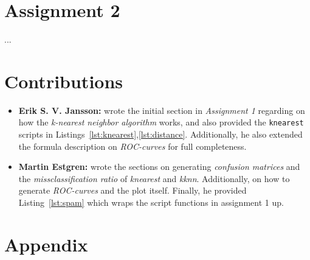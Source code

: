 \documentclass[a4paper, twocolumn]{article}
\begin{document}
    \section*{Assignment 2}

    ...

    \section*{Contributions}

    \begin{itemize}
        \item{\textbf{Erik S. V. Jansson:} wrote the initial section in \emph{Assignment 1} regarding on how the \emph{k-nearest neighbor algorithm} works, and also provided the \texttt{knearest} scripts in Listings~\ref{lst:knearest},\ref{lst:distance}. Additionally, he also extended the formula description on \emph{ROC-curves} for full completeness.}
        \item{\textbf{Martin Estgren:} wrote the sections on generating \emph{confusion matrices} and the \emph{missclassification ratio} of \emph{knearest} and \emph{kknn}. Additionally, on how to generate \emph{ROC-curves} and the plot itself. Finally, he provided Listing~\ref{lst:spam} which wraps the script functions in assignment 1 up.}
    \end{itemize}

    \nocite{*} %
    
    
    \onecolumn \appendix
    \section*{Appendix}

    
    
    
\end{document}
